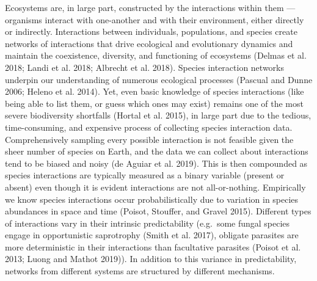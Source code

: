 \documentclass[11pt]{article}
\begin{document}
Ecosystems are, in large part, constructed by the interactions within
them --- organisms interact with one-another and with their environment,
either directly or indirectly. Interactions between individuals,
populations, and species create networks of interactions that drive
ecological and evolutionary dynamics and maintain the coexistence,
diversity, and functioning of ecosystems (Delmas et al. 2018; Landi et
al. 2018; Albrecht et al. 2018). Species interaction networks underpin
our understanding of numerous ecological processes (Pascual and Dunne
2006; Heleno et al. 2014). Yet, even basic knowledge of species
interactions (like being able to list them, or guess which ones may
exist) remains one of the most severe biodiversity shortfalls (Hortal et
al. 2015), in large part due to the tedious, time-consuming, and
expensive process of collecting species interaction data.
Comprehensively sampling every possible interaction is not feasible
given the sheer number of species on Earth, and the data we can collect
about interactions tend to be biased and noisy (de Aguiar et al. 2019).
This is then compounded as species interactions are typically measured
as a binary variable (present or absent) even though it is evident
interactions are not all-or-nothing. Empirically we know species
interactions occur probabilistically due to variation in species
abundances in space and time (Poisot, Stouffer, and Gravel 2015).
Different types of interactions vary in their intrinsic predictability
(e.g.~some fungal species engage in opportunistic saprotrophy (Smith et
al. 2017), obligate parasites are more deterministic in their
interactions than facultative parasites (Poisot et al. 2013; Luong and
Mathot 2019)). In addition to this variance in predictability, networks
from different systems are structured by different mechanisms.
\end{document}
